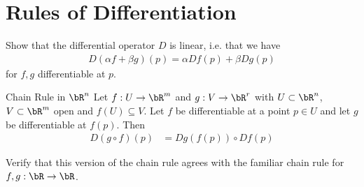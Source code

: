 \section{Rules of Differentiation}
\begin{exercise}
	Show that the differential operator $D$ is linear, i.e. that we have
	\begin{align*}
		D(\alpha f + \beta g)(p) = \alpha Df(p) + \beta Dg(p)
	\end{align*}
	for $f, g$ differentiable at $p$.
\end{exercise}
\begin{importanttheorem}{Chain Rule in $\bR^n$}{}
	Let $f : U \to \bR^m$ and $g : V \to \bR^r$ with $U \subset \bR^n$, $V \subset \bR^m$ open and $f(U) \subseteq V$. Let $f$ be differentiable at a point $p \in U$ and let $g$ be differentiable at $f(p)$. Then
	\begin{align*}
		D(g \circ f)(p)
		&=
		Dg(f(p)) \circ Df(p)
	\end{align*}
\end{importanttheorem}
\begin{exercise}
	Verify that this version of the chain rule agrees with the familiar chain rule for $f,g : \bR \to \bR$.
\end{exercise}
